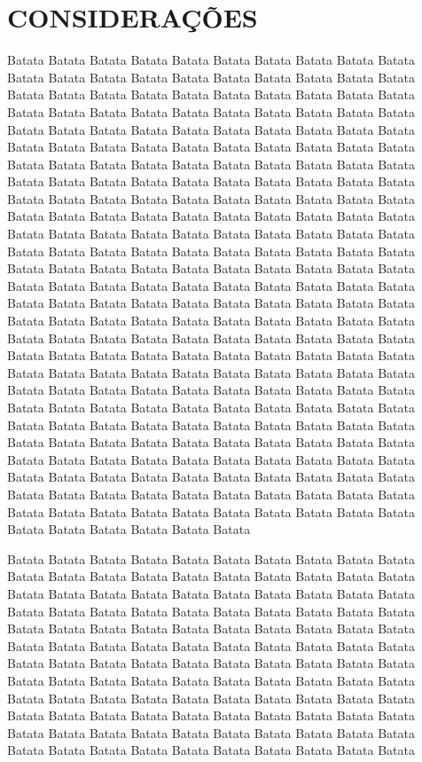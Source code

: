 \section{CONSIDERAÇÕES}
\vspace{0.5cm}

Batata Batata Batata Batata Batata Batata Batata Batata Batata Batata Batata Batata 
    Batata Batata Batata Batata Batata Batata Batata Batata Batata Batata Batata Batata 
    Batata Batata Batata Batata Batata Batata Batata Batata Batata Batata Batata Batata 
    Batata Batata Batata Batata Batata Batata Batata Batata Batata Batata Batata Batata 
    Batata Batata Batata Batata Batata Batata Batata Batata Batata Batata Batata Batata 
    Batata Batata Batata Batata Batata Batata Batata Batata Batata Batata Batata Batata 
    Batata Batata Batata Batata Batata Batata Batata Batata Batata Batata Batata Batata 
    Batata Batata Batata Batata Batata Batata Batata Batata Batata Batata Batata Batata 
    Batata Batata Batata Batata Batata Batata Batata Batata Batata Batata Batata Batata 
    Batata Batata Batata Batata Batata Batata Batata Batata Batata Batata Batata Batata 
    Batata Batata Batata Batata Batata Batata Batata Batata Batata Batata Batata Batata 
    Batata Batata Batata Batata Batata Batata Batata Batata Batata Batata Batata Batata 
    Batata Batata Batata Batata Batata Batata Batata Batata Batata Batata Batata Batata 
    Batata Batata Batata Batata Batata Batata Batata Batata Batata Batata Batata Batata 
    Batata Batata Batata Batata Batata Batata Batata Batata Batata Batata Batata Batata 
    Batata Batata Batata Batata Batata Batata Batata Batata Batata Batata Batata Batata 
    Batata Batata Batata Batata Batata Batata Batata Batata Batata Batata Batata Batata 
    Batata Batata Batata Batata Batata Batata Batata Batata Batata Batata Batata Batata 
    Batata Batata Batata Batata Batata Batata Batata Batata Batata Batata Batata Batata 
    Batata Batata Batata Batata Batata Batata Batata Batata Batata Batata Batata Batata 
    Batata Batata Batata Batata Batata Batata Batata Batata Batata Batata Batata Batata 
    Batata Batata Batata Batata Batata Batata Batata Batata Batata Batata Batata Batata 
    Batata Batata Batata Batata Batata Batata Batata Batata Batata Batata Batata Batata 
    
    Batata Batata Batata Batata Batata Batata Batata Batata Batata Batata Batata Batata 
    Batata Batata Batata Batata Batata Batata Batata Batata Batata Batata Batata Batata 
    Batata Batata Batata Batata Batata Batata Batata Batata Batata Batata Batata Batata 
    Batata Batata Batata Batata Batata Batata Batata Batata Batata Batata Batata Batata 
    Batata Batata Batata Batata Batata Batata Batata Batata Batata Batata Batata Batata 
    Batata Batata Batata Batata Batata Batata Batata Batata Batata Batata Batata Batata 
    Batata Batata Batata Batata Batata Batata Batata Batata Batata Batata Batata Batata 
    Batata Batata Batata Batata Batata Batata Batata Batata Batata Batata Batata Batata 
    Batata Batata Batata Batata Batata Batata Batata Batata Batata Batata Batata Batata 
    Batata Batata Batata Batata Batata Batata Batata Batata Batata Batata Batata Batata 
